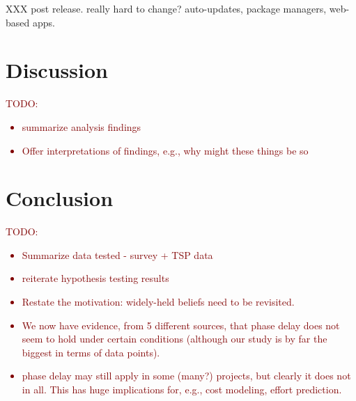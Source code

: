 \documentclass{sig-alternate}
\newcommand{\todo}[1]{\textcolor{Maroon}{TODO: #1}}
\newcommand{\bi}{\begin{itemize}[leftmargin=0.4cm]}
\newcommand{\ei}{\end{itemize}}
\begin{document}
XXX post release. really hard to change? auto-updates, package managers, web-based apps. 
 
 \section{Discussion}
 \todo{
 \bi
    \item summarize analysis findings
    \item Offer interpretations of findings, e.g., why might these things be so
 \ei
 }
 
 
 \section{Conclusion}
 \todo{
 \bi
    \item Summarize data tested - survey + TSP data
    \item reiterate hypothesis testing results
    \item Restate the motivation: widely-held beliefs need to be revisited. 
    \item We now have evidence, from 5 different sources, that phase delay does not seem to hold under certain conditions (although our study is by far the biggest in terms of data points).
    \item phase delay may still apply in some (many?) projects, but clearly it does not in all. This has huge implications for, e.g., cost modeling, effort prediction.
 \ei
 }
 
\end{document}

